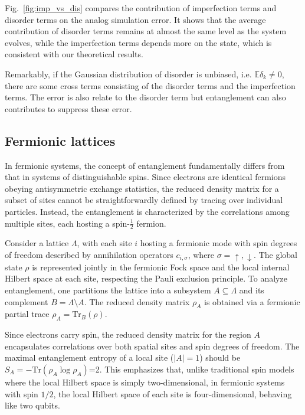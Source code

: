 \documentclass[12pt]{article}
\begin{document}
Fig.~\ref{fig:imp_vs_dis} compares the contribution of imperfection terms and disorder terms on the analog simulation error. It shows that the average contribution of disorder terms remains at almost the same level as the system evolves, while the imperfection terms depends more on the state, which is consistent with our theoretical results.



Remarkably, if the Gaussian distribution of disorder is unbiased, i.e. $\mathbb{E} \delta _k\ne0$, there are some cross terms consisting of the disorder terms and the imperfection terms. The error is also relate to the disorder term but entanglement can also contributes to suppress these error.

\subsection*{Fermionic lattices}



In fermionic systems, the concept of entanglement fundamentally differs from that in systems of distinguishable spins. Since electrons are identical fermions obeying antisymmetric exchange statistics, the reduced density matrix for a subset of sites cannot be straightforwardly defined by tracing over individual particles. Instead, the entanglement is characterized by the correlations among multiple sites, each hosting a spin-$\frac{1}{2}$ fermion.

Consider a lattice $\Lambda$, with each site $i$ hosting a fermionic mode with spin degrees of freedom described by annihilation operators $c_{i,\sigma}$, where $\sigma = \uparrow, \downarrow$. The global state $\rho$ is represented jointly in the fermionic Fock space and the local internal Hilbert space at each site, respecting the Pauli exclusion principle. To analyze entanglement, one partitions the lattice into a subsystem $A \subseteq \Lambda$ and its complement $B = \Lambda \setminus A$. The reduced density matrix $\rho_A$ is obtained via a fermionic partial trace
$\rho_A = \mathrm{Tr}_B (\rho)$.

Since electrons carry spin, the reduced density matrix for the region $A$ encapsulates correlations over both spatial sites and spin degrees of freedom. The maximal entanglement entropy of a local site ($|A|=1$) should be
$S_A = - \mathrm{Tr} (\rho_A \log \rho_A)$=2. 
This emphasizes that, unlike traditional spin models where the local Hilbert space is simply two-dimensional, in fermionic systems with spin $1/2$, the local Hilbert space of each site is four-dimensional, behaving like two qubits.
\end{document}
